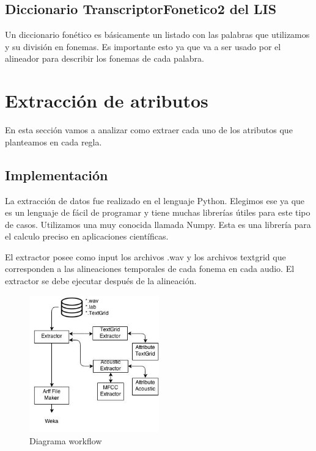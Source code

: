 \documentclass[11pt,a4paper,twoside]{tesis}
\begin{document}
\subsection{Diccionario TranscriptorFonetico2 del LIS}

Un diccionario fonético es básicamente un listado con las palabras que utilizamos y su división en fonemas. Es importante esto ya que va a ser usado por el alineador para describir los fonemas de cada palabra.

\section{Extracción de atributos}

En esta sección vamos a analizar como extraer cada uno de los atributos que planteamos en cada regla.

\subsection{Implementación}

La extracción de datos fue realizado en el lenguaje Python. Elegimos ese ya que es un lenguaje de fácil de programar y tiene muchas librerías útiles para este tipo de casos. Utilizamos una muy conocida llamada Numpy. Esta es una librería para el calculo preciso en aplicaciones científicas.

El extractor posee como input los archivos .wav y los archivos textgrid que corresponden a las alineaciones temporales de cada fonema en cada audio. El extractor se debe ejecutar después de la alineación. 

\begin{figure}[h!]
    \centerline{\includegraphics[width=0.5\textwidth]{diagrama_workflow} }
    \caption{Diagrama workflow}
\end{figure}
\end{document}
